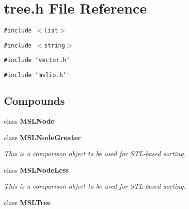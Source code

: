 \section{tree.h File Reference}
\label{tree_8h}
{\tt \#include $<$list$>$}\par
{\tt \#include $<$string$>$}\par
{\tt \#include \char`\"{}vector.h\char`\"{}}\par
{\tt \#include \char`\"{}mslio.h\char`\"{}}\par
\subsection*{Compounds}
\begin{CompactItemize}
\item 
class {\bf MSLNode}
\item 
class {\bf MSLNode\-Greater}
\begin{CompactList}\small\item\em This is a comparison object to be used for STL-based sorting.\item\end{CompactList}\item 
class {\bf MSLNode\-Less}
\begin{CompactList}\small\item\em This is a comparison object to be used for STL-based sorting.\item\end{CompactList}\item 
class {\bf MSLTree}
\end{CompactItemize}
